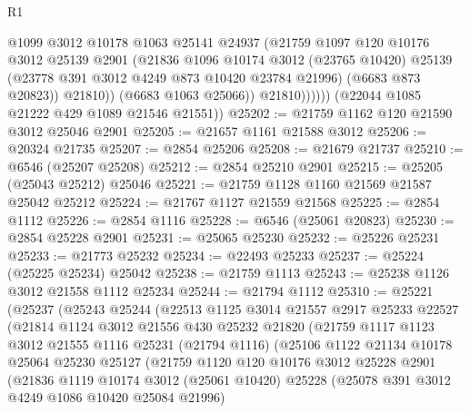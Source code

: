 \begin{lexlean}{R1}
\begin{coremodule}
                      @1099
                      @3012
                      @10178
                      @1063
                      @25141
                      @24937
                      (@21759
                        @1097
                        @120
                        @10176
                        @3012
                        @25139
                        @2901
                        (@21836
                          @1096
                          @10174
                          @3012
                          (@23765 @10420)
                          @25139
                          (@23778 @391 @3012 @4249 @873 @10420 @23784 @21996)
                          (@6683 @873 @20823))
                        @21810))
                    (@6683 @1063 @25066))
                  @21810))))))
      (@22044 @1085 @21222 @429 @1089 @21546 @21551))
@25202 := @21759 @1162 @120 @21590 @3012 @25046 @2901
@25205 := @21657 @1161 @21588 @3012
@25206 := @20324 @21735
@25207 := @2854 @25206
@25208 := @21679 @21737
@25210 := @6546 (@25207 @25208)
@25212 := @2854 @25210 @2901
@25215 := @25205 (@25043 @25212) @25046
@25221 := @21759 @1128 @1160 @21569 @21587 @25042 @25212
@25224 := @21767 @1127 @21559 @21568
@25225 := @2854 @1112
@25226 := @2854 @1116
@25228 := @6546 (@25061 @20823)
@25230 := @2854 @25228 @2901
@25231 := @25065 @25230
@25232 := @25226 @25231
@25233 := @21773 @25232
@25234 := @22493 @25233
@25237 := @25224 (@25225 @25234) @25042
@25238 := @21759 @1113
@25243 := @25238 @1126 @3012 @21558 @1112 @25234
@25244 := @21794 @1112
@25310 := @25221
    (@25237
      (@25243
        @25244
        (@22513
          @1125
          @3014
          @21557
          @2917
          @25233
          @22527
          (@21814
            @1124
            @3012
            @21556
            @430
            @25232
            @21820
            (@21759
              @1117
              @1123
              @3012
              @21555
              @1116
              @25231
              (@21794 @1116)
              (@25106
                @1122
                @21134
                @10178
                @25064
                @25230
                @25127
                (@21759
                  @1120
                  @120
                  @10176
                  @3012
                  @25228
                  @2901
                  (@21836
                    @1119
                    @10174
                    @3012
                    (@25061 @10420)
                    @25228
                    (@25078 @391 @3012 @4249 @1086 @10420 @25084 @21996)

\end{coremodule}
\end{lexlean}
